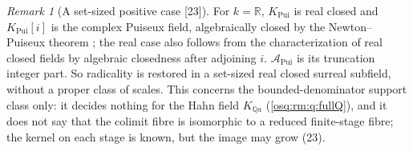 \documentclass[11pt,letterpaper]{article}
\numberwithin{equation}{section}
\theoremstyle{definition}
\theoremstyle{remark}
\newtheorem{remark}[remark]{Remark}
\theoremstyle{plain}
\newcommand{\Q}{\mathbb Q}
\newcommand{\R}{\mathbb R}
\newcommand{\A}{\mathcal A}          %
\newcommand{\src}[1]{\textup{\textsf{[#1]}}}
\begin{document}
\begin{remark}[A set-sized positive case \src{23}]\label{osq:rm:rem:positivecase}
For $k=\R$, $K_{\mathrm{Pui}}$ is real closed and $K_{\mathrm{Pui}}[i]$ is the complex Puiseux field, algebraically closed by the Newton--Puiseux theorem
\cite{Nowak}; the real case also follows from the characterization of real closed fields by algebraic closedness after adjoining $i$. $\A_{\mathrm{Pui}}$ is
its truncation integer part. So radicality is restored in a set-sized real closed surreal subfield, without a proper class of scales. This concerns the
bounded-denominator support class only: it decides nothing for the Hahn field $K_{\Q a}$ (\cref{osq:rm:q:fullQ}), and it does not say that the colimit
fibre is isomorphic to a reduced finite-stage fibre; the kernel on each stage is known, but the image may grow (23).
\end{remark}
\end{document}
